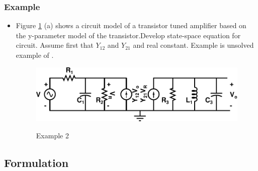 \documentclass{beamer}
\begin{document}
\begin{frame}
\frametitle{Example}
\begin{small}
        \begin{itemize}
\item {Figure \ref{ex3} (a) shows a circuit model of a transistor tuned amplifier based on the y-parameter model of the transistor.Develop state-space equation for circuit. Assume first that $Y_{12}$ and $Y_{21}$ and real constant. Example is unsolved example of \cite{Ander}.}

\begin{figure}[h!]
\centering
{\label{method}\includegraphics[totalheight=.2\textheight,width=.6\textwidth]{images/Trans}}
\caption{Example 2}
\label{ex3}
\end{figure} 

\end{itemize}
\end{small}

\let\thefootnote\relax{}	

\end{frame}




\subsection*{Formulation}
\end{document}
